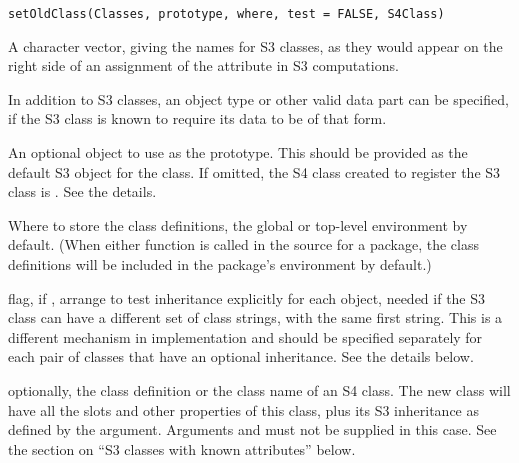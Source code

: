 %
\begin{Usage}
\begin{verbatim}
setOldClass(Classes, prototype, where, test = FALSE, S4Class)
\end{verbatim}
\end{Usage}
%
\begin{Arguments}
\begin{ldescription}
\item[\code{Classes}] 
A character vector, giving the names for S3
classes, as they would appear on the right side of an assignment of
the  attribute in S3 computations.

In addition to S3 classes, an object type or other valid data part
can be specified, if the S3 class is known to require its data to
be of that form.

\item[\code{prototype}] 
An optional object to use as the prototype.  This should be provided
as the default S3 object for the class.  If omitted, the S4 class
created to register the S3 class is .  See the
details.

\item[\code{where}] 
Where to store the class definitions, the global or top-level
environment by default.  (When either function is called in the
source for a package, the class definitions will be included in the
package's environment by default.)

\item[\code{test}] flag, if , arrange to test inheritance 
explicitly for each object, needed if the S3 class can have a
different set of class strings, with the same first string.
This is a different mechanism in implementation and should be
specified separately for each pair of classes that have an
optional inheritance.
See the details below.

\item[\code{S4Class}]  optionally, the class definition or the class name
of an S4 class.  The new class will have all the slots and other
properties of this class, plus its S3 inheritance as defined by
the  argument.  Arguments  and
 must not be supplied in this case.  See the section
on ``S3 classes with known attributes'' below.


\end{ldescription}
\end{Arguments}
%
